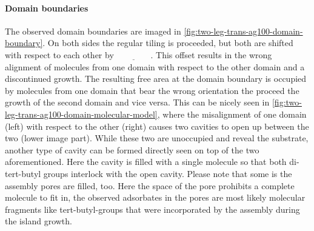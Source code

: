 	\paragraph{Domain boundaries}
	The observed domain boundaries are imaged in \autoref{fig:two-leg-trans-ag100-domain-boundary}. On both sides the regular tiling is proceeded, but both are shifted with respect to each other by $\underline{\qquad \qquad}$. This offset results in the wrong alignment of molecules from one  domain with respect to the other domain and a discontinued growth. The resulting free area at the domain boundary is occupied by molecules from one domain that bear the wrong orientation the proceed the growth of the second domain and vice versa. This can be nicely seen in 		\autoref{fig:two-leg-trans-ag100-domain-molecular-model}, where the misalignment of one domain (left) with respect to the other (right) causes two cavities to open up between the two (lower image part). While these two are unoccupied and reveal the substrate, another type of cavity can be formed directly seen on top of the two aforementioned. Here the cavity is filled with a single molecule so that both di-tert-butyl groups interlock with the open cavity. Please note that some is the assembly pores are filled, too. Here the space of the pore prohibits a complete molecule to fit in, the observed adsorbates in the pores are most likely molecular fragments like tert-butyl-groups that were incorporated by the assembly during the island growth.
	

